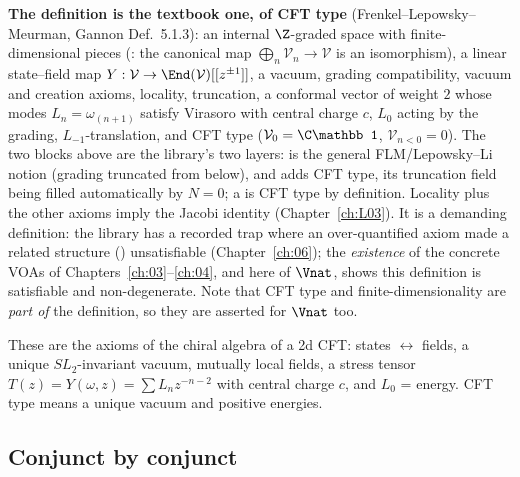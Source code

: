 \begin{dictionary}
\textbf{The definition is the textbook one, of CFT type} (Frenkel--Lepowsky--Meurman, Gannon Def.~5.1.3): an internal
$\Z$-graded space with finite-dimensional pieces (: the canonical map
$\bigoplus_n\mathcal V_n\to\mathcal V$ is an isomorphism), a linear state--field map
$Y:\mathcal V\to\End(\mathcal V)[[z^{\pm1}]]$, a vacuum, grading compatibility, vacuum and creation axioms,
locality, truncation, a conformal vector of weight $2$ whose modes $L_n=\omega_{(n+1)}$ satisfy Virasoro with
central charge $c$, $L_0$ acting by the grading, $L_{-1}$-translation, and CFT type
($\mathcal V_0=\C\mathbb 1$, $\mathcal V_{n<0}=0$).  The two blocks above are the library's two layers:
 is the general FLM/Lepowsky--Li notion (grading truncated from below), and
 adds CFT type, its truncation field being filled automatically by $N=0$; a
 is CFT type by definition.  Locality plus the other axioms imply the Jacobi
identity (Chapter~\ref{ch:L03}).  It is a demanding definition: the library has a recorded trap where an
over-quantified axiom made a related structure () unsatisfiable
(Chapter~\ref{ch:06}); the \emph{existence} of the concrete VOAs of Chapters~\ref{ch:03}--\ref{ch:04}, and
here of $\Vnat$, shows this definition is satisfiable and non-degenerate.  Note that CFT type and
finite-dimensionality are \emph{part of} the definition, so they are asserted for $\Vnat$ too.
\end{dictionary}

\begin{physics}
These are the axioms of the chiral algebra of a 2d CFT: states $\leftrightarrow$ fields, a unique
$SL_2$-invariant vacuum, mutually local fields, a stress tensor $T(z)=Y(\omega,z)=\sum L_nz^{-n-2}$ with
central charge $c$, and $L_0$ = energy.  CFT type means a unique vacuum and positive energies.
\end{physics}

\subsection{Conjunct by conjunct}

